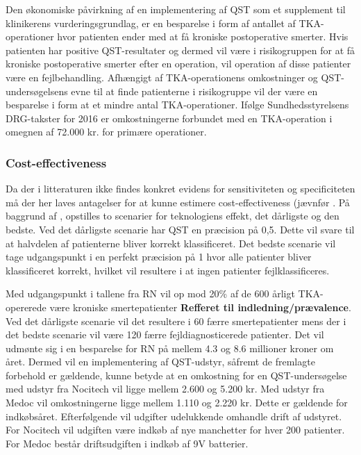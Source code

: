 Den økonomiske påvirkning af en implementering af QST som et supplement til klinikerens vurderingsgrundlag, er en besparelse i form af antallet af TKA-operationer hvor patienten ender med at få kroniske postoperative smerter. Hvis patienten har positive QST-resultater og dermed vil være i risikogruppen for at få kroniske postoperative smerter efter en operation, vil operation af disse patienter være en fejlbehandling. Afhængigt af TKA-operationens omkostninger og QST-undersøgelsens evne til at finde patienterne i risikogruppe vil der være en besparelse i form at et mindre antal TKA-operationer. Ifølge Sundhedsstyrelsens DRG-takster for 2016 er omkostningerne forbundet med en TKA-operation i omegnen af 72.000 kr. for primære operationer. \citep{Takst2016}


\subsubsection{Cost-effectiveness}
Da der i litteraturen ikke findes konkret evidens for sensitiviteten og specificiteten må der her laves antagelser for at kunne estimere cost-effectiveness (jævnfør . På baggrund af , opstilles to scenarier for teknologiens effekt, det dårligste og den bedste. Ved det dårligste scenarie har QST en præcision på 0,5. Dette vil svare til at halvdelen af patienterne bliver korrekt klassificeret. Det bedste scenarie vil tage udgangspunkt i en perfekt præcision på 1 hvor alle patienter bliver klassificeret korrekt, hvilket vil resultere i at ingen patienter fejlklassificeres.  


Med udgangspunkt i tallene fra RN vil op mod 20\% af de 600 årligt TKA-opererede være kroniske smertepatienter \textbf{Refferet til indledning/prævalence}. Ved det dårligste scenarie vil det resultere i 60 færre smertepatienter mens der i det bedste scenarie vil være 120 færre fejldiagnosticerede patienter. Det vil udmønte sig i en besparelse for RN på mellem 4.3 og 8.6 millioner kroner om året. Dermed vil en implementering af QST-udstyr, såfremt de fremlagte forbehold er gældende, kunne betyde at en omkostning for en QST-undersøgelse med udstyr fra Nocitech vil ligge mellem 2.600 og 5.200 kr. Med udstyr fra Medoc vil omkostningerne ligge mellem 1.110 og 2.220 kr. Dette er gældende for indkøbsåret. Efterfølgende vil udgifter udelukkende omhandle drift af udstyret. For Nocitech vil udgiften være indkøb af nye manchetter for hver 200 patienter. For Medoc består driftsudgiften i indkøb af 9V batterier. 


